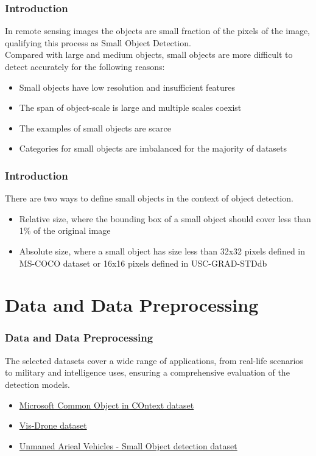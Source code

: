 \documentclass{beamer}
\begin{document}
\begin{frame}[t]
  \frametitle{Introduction}
  In remote sensing images the objects are small fraction of the pixels of the image, qualifying this process as Small Object Detection. \\
  \vspace{0.5cm}
  Compared with large and medium objects, small objects are more difficult to detect accurately for the following reasons:
  \begin{itemize}
    \item Small objects have low resolution and insufficient features
    \item The span of object-scale is large and multiple scales coexist
    \item The examples of small objects are scarce
    \item Categories for small objects are imbalanced for the majority of datasets
  \end{itemize}
\end{frame}


\begin{frame}[t]
  \frametitle{Introduction}
  There are two ways to define small objects in the context of object detection.
  \begin{itemize}
    \item Relative size, where the bounding box of a small object should cover less than 1\% of the original image
    \item Absolute size, where a small object has size less than 32x32 pixels defined in MS-COCO dataset or 16x16 pixels defined in USC-GRAD-STDdb 
  \end{itemize} 

\end{frame}


\section{Data and Data Preprocessing}
\begin{frame}[t]
  \frametitle{Data and Data Preprocessing}
  The selected datasets cover a wide range of applications, from real-life scenarios to military and intelligence uses, ensuring a comprehensive evaluation 
  of the detection models.

  \begin{itemize}
    \item \hyperlink{https://cocodataset.org/}{Microsoft Common Object in COntext dataset}
    \item \hyperlink{https://github.com/VisDrone/VisDrone-Dataset}{Vis-Drone dataset}
    \item \hyperlink{https://www.kaggle.com/datasets/sovitrath/uav-small-object-detection-dataset}{Unmaned Arieal Vehicles - Small Object detection dataset}
  \end{itemize}
\end{frame}
\end{document}
